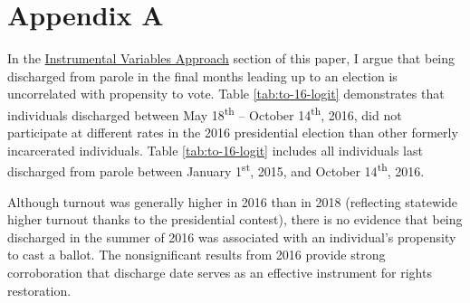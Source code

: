 \documentclass[]{article}
\begin{document}
\newpage

\hypertarget{appendix-a}{%
\section*{Appendix A}\label{appendix-a}}

In the \protect\hyperlink{instrumental-variables-approach}{Instrumental Variables Approach} section of this paper, I argue that being discharged from parole in the final months leading up to an election is uncorrelated with propensity to vote. Table \ref{tab:to-16-logit} demonstrates that individuals discharged between May 18\textsuperscript{th} -- October 14\textsuperscript{th}, 2016, did not participate at different rates in the 2016 presidential election than other formerly incarcerated individuals. Table \ref{tab:to-16-logit} includes all individuals last discharged from parole between January 1\textsuperscript{st}, 2015, and October 14\textsuperscript{th}, 2016.



Although turnout was generally higher in 2016 than in 2018 (reflecting statewide higher turnout thanks to the presidential contest), there is no evidence that being discharged in the summer of 2016 was associated with an individual's propensity to cast a ballot. The nonsignificant results from 2016 provide strong corroboration that discharge date serves as an effective instrument for rights restoration.
\end{document}
